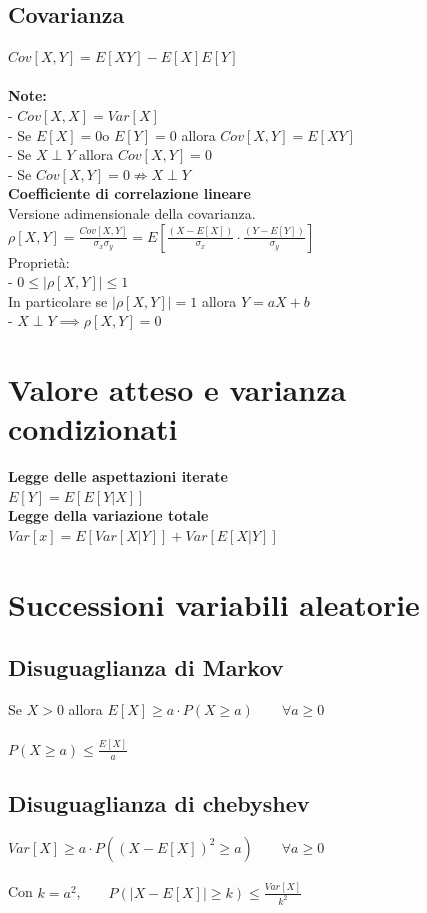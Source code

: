 \documentclass{article}
\begin{document}
\begin{multicols*}{3}
		\subsection{Covarianza}
		\(Cov[X,Y] = E[XY] -E[X]E[Y]\)\\\\
		\textbf{Note:}\\
		- \(Cov[X,X] = Var[X]\)\\
		- Se \(E[X] = 0 \)o \(E[Y] = 0\) allora \(Cov[X,Y] = E[XY]\)\\
		- Se \(X\perp Y\) allora \(Cov[X,Y] =0\)\\
		- Se \(Cov[X,Y] = 0 \nRightarrow X\perp Y\)\\ 
		\textbf{Coefficiente di correlazione lineare}\\
		Versione adimensionale della covarianza.\\
		\(\rho[X,Y] = \frac{Cov[X,Y]}{\sigma_x\sigma_y}= E[\frac{(X-E[X])}{\sigma_x}\cdot \frac{(Y-E[Y])}{\sigma_y}]\)\\
		Proprietà:\\
		- \(0\leq|\rho[X,Y]| \leq 1\)\\
		In particolare se \(|\rho[X,Y]| = 1\) allora \(Y=aX+b\)\\
		- \(X\perp Y \implies\rho[X,Y] = 0 \)
		\section{Valore atteso e varianza condizionati}
		\textbf{Legge delle aspettazioni iterate}\\
		\(E[Y] = E[E[Y|X]]\)\\
		\textbf{Legge della variazione totale}\\
		\(Var[x] = E[Var[X|Y]] + Var[E[X|Y]] \)\\
		
		
		\section{Successioni variabili aleatorie}
		\subsection{Disuguaglianza di Markov}
		Se \(X > 0\) allora \(E[X] \geq a \cdot P(X\geq a) \qquad \forall a\geq 0\)\\\\
		\(P(X\geq a) \leq \frac{E[X]}{a}\)\\
		\subsection{Disuguaglianza di chebyshev}
		\(Var[X] \geq a \cdot P((X-E[X])^2 \geq a) \qquad \forall a\geq 0\)\\\\
		Con \(k= a^2\),\(\qquad P(|X-E[X]|\geq k) \leq \frac{Var[X]}{k^2}\)\\
		

\end{multicols*}
\end{document}
